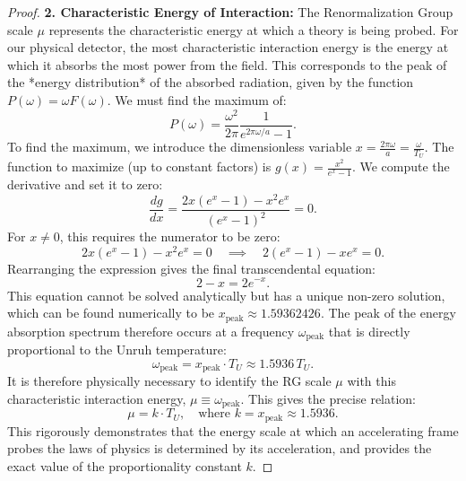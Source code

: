\documentclass[11pt, letterpaper]{report}
\theoremstyle{plain} %
\theoremstyle{definition} %
\theoremstyle{remark} %
\begin{document}
\begin{proof}
\textbf{2. Characteristic Energy of Interaction:}
The Renormalization Group scale $\mu$ represents the characteristic energy at which a theory is being probed. For our physical detector, the most characteristic interaction energy is the energy at which it absorbs the most power from the field. This corresponds to the peak of the *energy distribution* of the absorbed radiation, given by the function $P(\omega) = \omega F(\omega)$. We must find the maximum of:
\begin{equation}
    P(\omega) = \frac{\omega^2}{2\pi} \frac{1}{e^{2\pi\omega/a} - 1}.
\end{equation}
To find the maximum, we introduce the dimensionless variable $x = \frac{2\pi\omega}{a} = \frac{\omega}{T_U}$. The function to maximize (up to constant factors) is $g(x) = \frac{x^2}{e^x - 1}$. We compute the derivative and set it to zero:
\begin{equation}
    \frac{dg}{dx} = \frac{2x(e^x - 1) - x^2e^x}{(e^x - 1)^2} = 0.
\end{equation}
For $x \neq 0$, this requires the numerator to be zero:
\begin{equation}
    2x(e^x - 1) - x^2e^x = 0 \quad \implies \quad 2(e^x - 1) - xe^x = 0.
\end{equation}
Rearranging the expression gives the final transcendental equation:
\begin{equation}
    2 - x = 2e^{-x}.
    \label{eq:transcendental_k}
\end{equation}
This equation cannot be solved analytically but has a unique non-zero solution, which can be found numerically to be $x_{\text{peak}} \approx 1.59362426$. The peak of the energy absorption spectrum therefore occurs at a frequency $\omega_{\text{peak}}$ that is directly proportional to the Unruh temperature:
\begin{equation}
    \omega_{\text{peak}} = x_{\text{peak}} \cdot T_U \approx 1.5936 \, T_U.
\end{equation}
It is therefore physically necessary to identify the RG scale $\mu$ with this characteristic interaction energy, $\mu \equiv \omega_{\text{peak}}$. This gives the precise relation:
\begin{equation}
    \mu = k \cdot T_U, \quad \text{where } k = x_{\text{peak}} \approx 1.5936.
\end{equation}
This rigorously demonstrates that the energy scale at which an accelerating frame probes the laws of physics is determined by its acceleration, and provides the exact value of the proportionality constant $k$.
\end{proof}
\end{document}
